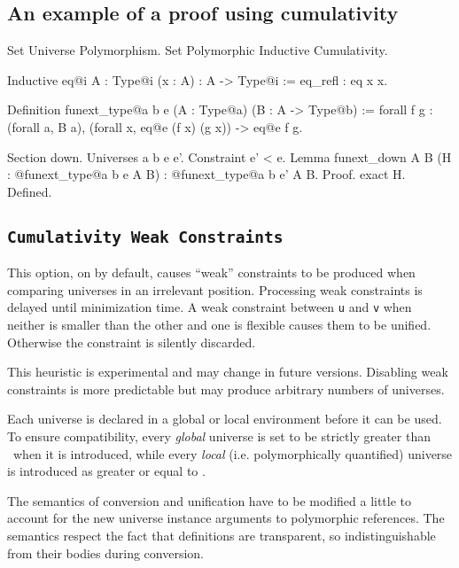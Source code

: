 \subsection*{An example of a proof using cumulativity}

\begin{coq_example}
Set Universe Polymorphism.
Set Polymorphic Inductive Cumulativity.

Inductive eq@{i} {A : Type@{i}} (x : A) : A -> Type@{i} := eq_refl : eq x x.

Definition funext_type@{a b e} (A : Type@{a}) (B : A -> Type@{b})
  := forall f g : (forall a, B a),
    (forall x, eq@{e} (f x) (g x))
    -> eq@{e} f g.

Section down.
  Universes a b e e'.
  Constraint e' < e.
  Lemma funext_down {A B}
    (H : @funext_type@{a b e} A B) : @funext_type@{a b e'} A B.
  Proof.
    exact H.
  Defined.
\end{coq_example}

\subsection{\tt Cumulativity Weak Constraints}

This option, on by default, causes ``weak'' constraints to be produced
when comparing universes in an irrelevant position. Processing weak
constraints is delayed until minimization time. A weak constraint
between {\tt u} and {\tt v} when neither is smaller than the other and
one is flexible causes them to be unified. Otherwise the constraint is
silently discarded.

This heuristic is experimental and may change in future versions.
Disabling weak constraints is more predictable but may produce
arbitrary numbers of universes.


Each universe is declared in a global or local environment before it can
be used. To ensure compatibility, every \emph{global} universe is set to
be strictly greater than \Set~when it is introduced, while every
\emph{local} (i.e. polymorphically quantified) universe is introduced as
greater or equal to \Set.


The semantics of conversion and unification have to be modified a little
to account for the new universe instance arguments to polymorphic
references. The semantics respect the fact that definitions are
transparent, so indistinguishable from their bodies during conversion.

